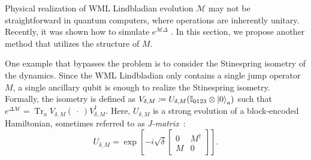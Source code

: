 \documentclass[superscriptaddress,amsmath,amssymb,aps,pra,letterpaper,tightenlines,notitlepages,12pt]{revtex4-2}
\begin{document}
Physical realization of WML Lindbladian evolution $\mathcal{M}$ may not be straightforward in quantum computers, where operations are inherently unitary. Recently, it was shown how to simulate $e^{\mathcal{M}\Delta}$ \cite[Appendices B and C]{sims2025DigitalQuantumSimulations}. In this section, we propose another method that utilizes the structure of $M$.

One example that bypasses the problem is to consider the Stinespring isometry of the dynamics. Since the WML Lindbladian only contains a single jump operator $M$, a single ancillary qubit is enough to realize the Stinespring isometry. Formally, the isometry is defined as $V_{\delta, M}\coloneqq U_{\delta, M} (\mathbb{I}_{0123}\otimes\ket{0}_a)$ such that $e^{\Delta\mathcal{M}}=\operatorname{Tr}_{a}V_{\delta, M}(~\cdot~)V_{\delta, M}^\dagger$. Here, $U_{\delta, M}$ is a strong evolution of a block-encoded Hamiltonian, sometimes referred to as \emph{J-matrix}~\cite{cleve2019EfficientQuantumAlgorithms, childs2023EfficientSimulationSparse, sims2025DigitalQuantumSimulations}:
\begin{equation}
    U_{\delta, M} = \exp\!\left[{-i\sqrt{\delta}\begin{bmatrix}
        0 & M^\dagger \\ M & 0
    \end{bmatrix}}\right].
\end{equation} 
\end{document}
